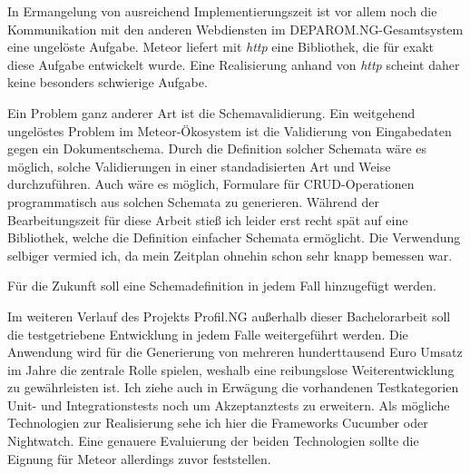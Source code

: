 In Ermangelung von ausreichend Implementierungszeit ist vor allem noch die
Kommunikation mit den anderen Webdiensten im DEPAROM.NG-Gesamtsystem eine
ungelöste Aufgabe. Meteor liefert mit \textit{http} eine Bibliothek, die für
exakt diese Aufgabe entwickelt wurde. Eine Realisierung anhand von \textit{http}
scheint daher keine besonders schwierige Aufgabe.

Ein Problem ganz anderer Art ist die Schemavalidierung. Ein weitgehend
ungelöstes Problem im Meteor-Ökosystem ist die Validierung von Eingabedaten
gegen ein Dokumentschema. Durch die Definition solcher Schemata wäre es möglich,
solche Validierungen in einer standadisierten Art und Weise durchzuführen. Auch
wäre es möglich, Formulare für CRUD-Operationen programmatisch aus solchen
Schemata zu generieren. Während der Bearbeitungszeit für diese Arbeit stieß ich
leider erst recht spät auf eine Bibliothek, welche die Definition einfacher
Schemata ermöglicht. Die Verwendung selbiger vermied ich, da mein Zeitplan
ohnehin schon sehr knapp bemessen war.

Für die Zukunft soll eine Schemadefinition in jedem Fall hinzugefügt werden.

Im weiteren Verlauf des Projekts Profil.NG außerhalb dieser Bachelorarbeit soll
die testgetriebene Entwicklung in jedem Falle weitergeführt werden. Die
Anwendung wird für die Generierung von mehreren hunderttausend Euro Umsatz im
Jahre die zentrale Rolle spielen, weshalb eine reibungslose Weiterentwicklung zu
gewährleisten ist. Ich ziehe auch in Erwägung die vorhandenen Testkategorien
Unit- und Integrationstests noch um Akzeptanztests zu erweitern. Als mögliche
Technologien zur Realisierung sehe ich hier die Frameworks Cucumber oder
Nightwatch. Eine genauere Evaluierung der beiden Technologien sollte die Eignung
für Meteor allerdings zuvor feststellen.
